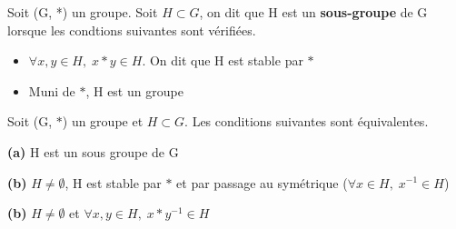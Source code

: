 \documentclass[a4paper, 12pt]{article}
\begin{document}
\begin{definition}
    Soit (G, *) un groupe. Soit $H \subset G$, on dit que H est un \textbf{sous-groupe} de G lorsque les condtions suivantes sont vérifiées.
    \begin{itemize}
        \item $\forall x, y \in H, \; x * y \in H$. On dit que H est stable par $*$
        \item Muni de $*$, H est un groupe
    \end{itemize}
\end{definition}

\begin{proposition}
    Soit (G, $*$) un groupe et $H \subset G$. Les conditions suivantes sont équivalentes.

    \item \textbf{(a)} H est un sous groupe de G
    \item \textbf{(b)} $H \neq \emptyset$, H est stable par $*$ et par passage au symétrique ($\forall x \in H, \; x^{-1} \in H$)
    \item \textbf{(b)} $H \neq \emptyset$ et $\forall x, y \in H, \; x * y^{-1} \in H$
\end{proposition}
\end{document}
